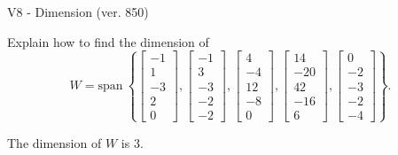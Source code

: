 \begin{exercise}
  \begin{exerciseTitle}V8 - Dimension (ver. 850)\end{exerciseTitle}
  \begin{exerciseStatement}
    Explain how to find the dimension of 
\[W=\mathrm{span}\ \left\{\left[\begin{array}{r}
-1 \\
1 \\
-3 \\
2 \\
0
\end{array}\right] , \left[\begin{array}{r}
-1 \\
3 \\
-3 \\
-2 \\
-2
\end{array}\right] , \left[\begin{array}{r}
4 \\
-4 \\
12 \\
-8 \\
0
\end{array}\right] , \left[\begin{array}{r}
14 \\
-20 \\
42 \\
-16 \\
6
\end{array}\right] , \left[\begin{array}{r}
0 \\
-2 \\
-3 \\
-2 \\
-4
\end{array}\right]\right\}.\]



  \end{exerciseStatement}
  \begin{exerciseAnswer}
   The dimension of \(W\) is  \(3\).
  


  \end{exerciseAnswer}
\end{exercise}
